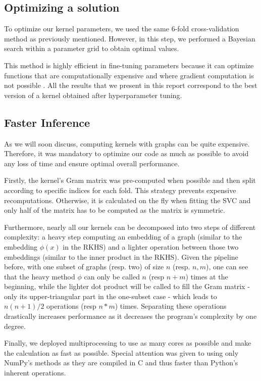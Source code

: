 \documentclass{IEEEtran}
\begin{document}
\subsection{Optimizing a solution}
To optimize our kernel parameters, we used the same 6-fold cross-validation method as previously mentioned. However, in this step, we performed a Bayesian search within a parameter grid to obtain optimal values.

This method is highly efficient in fine-tuning parameters because it can optimize functions that are computationally expensive and where gradient computation is not possible \cite{stone1976theory}.
All the results that we present in this report correspond to the best version of a kernel obtained after hyperparameter tuning.

\subsection{Faster Inference}
As we will soon discuss, computing kernels with graphs can be quite expensive. Therefore, it was mandatory to optimize our code as much as possible to avoid any loss of time and ensure optimal overall performance.

Firstly, the kernel's Gram matrix was pre-computed when possible and then split according to specific indices for each fold. This strategy prevents expensive recomputations. Otherwise, it is calculated on the fly when fitting the SVC and only half of the matrix has to be computed as the matrix is symmetric.

Furthermore, nearly all our kernels can be decomposed into two steps of different complexity:
a heavy step computing an embedding of a graph (similar to the embedding $\phi(x)$ in the RKHS)
and a lighter operation between those two embeddings (similar to the inner product in the RKHS).
Given the pipeline before, with one subset of graphs (resp. two) of size
$n$ (resp. $n,m$), one can see that the heavy method $\phi$ can only be called
$n$ (resp $n+m$) times at the beginning,
while the lighter dot product will be called to fill the Gram matrix
- only its upper-triangular part in the one-subset case -
which leads to $n(n+1)/2$ operations (resp $n*m$) times.
Separating these operations drastically increases performance as it decreases the program's complexity
by one degree.

Finally, we deployed multiprocessing to use as many cores as possible and make the calculation as fast as possible. Special attention was given to using only NumPy's methods as they are compiled in C and thus faster than Python's inherent operations.
\end{document}
